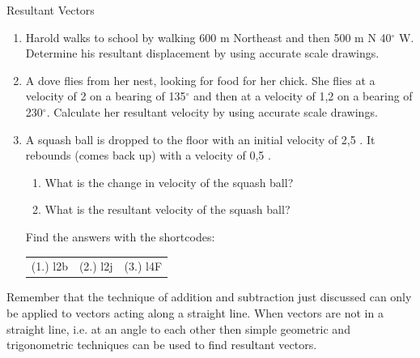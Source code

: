 \begin{exercises}{Resultant Vectors}{ \noindent
\begin{enumerate}[noitemsep, label=\textbf{\arabic*}.]
\item Harold walks to school by walking 600 m Northeast and then 500 m N 40$^\circ$ W. Determine his resultant displacement by using accurate scale drawings.
\item A dove flies from her nest, looking for food for her chick. She flies at a velocity of 2 \ms on a bearing of 135$^\circ$ and then at a velocity of 1,2 \ms on a bearing of 230$^\circ$. Calculate her resultant velocity by using accurate scale drawings.
\item A squash ball is dropped to the floor with an initial velocity of 2,5 \ms. It rebounds (comes back up) with a velocity of 0,5 \ms. \begin{enumerate}
	\item What is the change in velocity of the squash ball?
	\item What is the resultant velocity of the squash ball?
	\end{enumerate}
  \label{59e414b70efc194a27a122db47d06ce6**end}
\par {} Find the answers with the shortcodes:
 \par \begin{tabular}[h]{ccc}
 (1.) l2b  &  (2.) l2j  &  (3.) l4F  \end{tabular}
\end{enumerate}
}
\end{exercises}

Remember that the technique of addition and subtraction just discussed can only be applied to vectors acting along a straight line. When vectors are not in a straight line, i.e. at an angle to each other then simple geometric and trigonometric techniques can be used to find resultant vectors.

